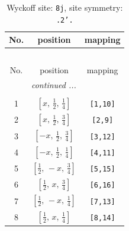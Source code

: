 \documentclass[fleqn,8pt]{jsarticle}
\begin{document}
\begin{longtable}{ccc}
\caption{Wyckoff site: {\tt 8j}, site symmetry: {\tt .2'.}}
 \\
 \hline \hline
No. & position & mapping \\ \hline \endfirsthead

\multicolumn{2}{l}{\tablename\ \thetable{}} \\
 \hline \hline
No. & position & mapping \\ \hline \endhead

 \hline \hline
\multicolumn{2}{r}{\footnotesize\it continued ...} \\ \endfoot

 \hline \hline
\multicolumn{2}{r}{} \\ \endlastfoot

1 & $\left[ x,\, \frac{1}{2},\, \frac{1}{4} \right]$ & {\tt [1,10]} \\ \hline
2 & $\left[ x,\, \frac{1}{2},\, \frac{3}{4} \right]$ & {\tt [2,9]} \\ \hline
3 & $\left[ - x,\, \frac{1}{2},\, \frac{3}{4} \right]$ & {\tt [3,12]} \\ \hline
4 & $\left[ - x,\, \frac{1}{2},\, \frac{1}{4} \right]$ & {\tt [4,11]} \\ \hline
5 & $\left[ \frac{1}{2},\, - x,\, \frac{3}{4} \right]$ & {\tt [5,15]} \\ \hline
6 & $\left[ \frac{1}{2},\, x,\, \frac{3}{4} \right]$ & {\tt [6,16]} \\ \hline
7 & $\left[ \frac{1}{2},\, - x,\, \frac{1}{4} \right]$ & {\tt [7,13]} \\ \hline
8 & $\left[ \frac{1}{2},\, x,\, \frac{1}{4} \right]$ & {\tt [8,14]} \\
\end{longtable}
\renewcommand{\arraystretch}{1.2}
\end{document}
